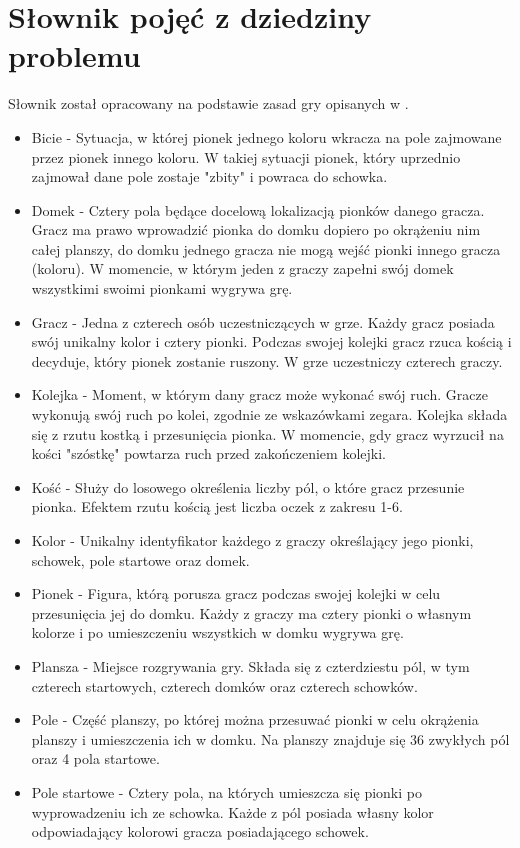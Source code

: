\documentclass[conference]{IEEEtran}
\begin{document}
\newpage
\section{Słownik pojęć z dziedziny problemu}
Słownik został opracowany na podstawie zasad gry opisanych w \cite{wiki}.
\begin{itemize}
    \item Bicie - Sytuacja, w której pionek jednego koloru wkracza na pole zajmowane przez pionek innego koloru. W takiej sytuacji pionek, który uprzednio zajmował dane pole zostaje "zbity" i powraca do schowka.
    \item Domek - Cztery pola będące docelową lokalizacją pionków danego gracza. Gracz ma prawo wprowadzić pionka do domku dopiero po okrążeniu nim całej planszy, do domku jednego gracza nie mogą wejść pionki innego gracza (koloru). W momencie, w którym jeden z graczy zapełni swój domek wszystkimi swoimi pionkami wygrywa grę.
    \item Gracz - Jedna z czterech osób uczestniczących w grze. Każdy gracz posiada swój unikalny kolor i cztery pionki. Podczas swojej kolejki gracz rzuca kością i decyduje, który pionek zostanie ruszony. W grze uczestniczy czterech graczy.
    \item Kolejka - Moment, w którym dany gracz może wykonać swój ruch. Gracze wykonują swój ruch po kolei, zgodnie ze wskazówkami zegara. Kolejka składa się z rzutu kostką i przesunięcia pionka. W momencie, gdy gracz wyrzucił na kości "szóstkę" powtarza ruch przed zakończeniem kolejki.
    \item Kość - Służy do losowego określenia liczby pól, o które gracz przesunie pionka. Efektem rzutu kością jest liczba oczek z zakresu 1-6.
    \item Kolor - Unikalny identyfikator każdego z graczy określający jego pionki, schowek, pole startowe oraz domek.
    \item Pionek - Figura, którą porusza gracz podczas swojej kolejki w celu przesunięcia jej do domku. Każdy z graczy ma cztery pionki o własnym kolorze i po umieszczeniu wszystkich w domku wygrywa grę.
    \item Plansza - Miejsce rozgrywania gry. Składa się z czterdziestu pól, w tym czterech startowych, czterech domków oraz czterech schowków.
    \item Pole - Część planszy, po której można przesuwać pionki w celu okrążenia planszy i umieszczenia ich w domku. Na planszy znajduje się 36 zwykłych pól oraz 4 pola startowe.
    \item Pole startowe - Cztery pola, na których umieszcza się pionki po wyprowadzeniu ich ze schowka. Każde z pól posiada własny kolor odpowiadający kolorowi gracza posiadającego schowek.

\end{itemize}
\end{document}
